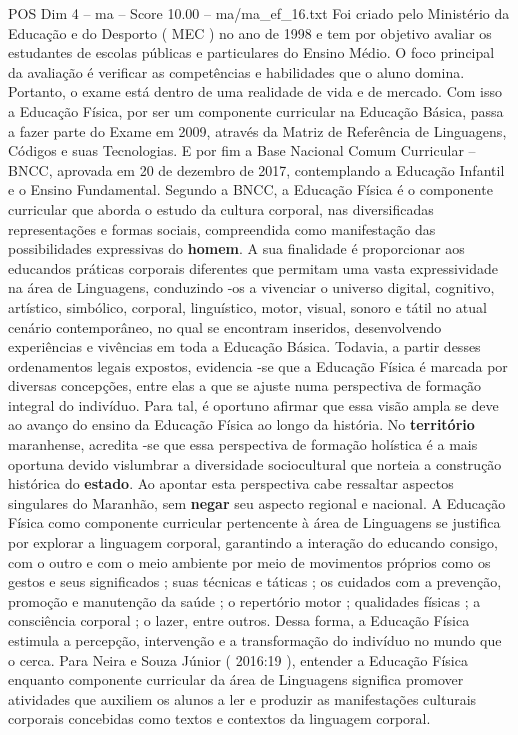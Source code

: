 \begin{textsample}{POS Dim 4 – ma – Score 10.00 – ma/ma\_ef\_16.txt}
Foi criado pelo Ministério da Educação e do Desporto ( MEC ) no ano de 1998 e tem por objetivo avaliar os estudantes de escolas públicas e particulares do Ensino Médio.
O foco principal da avaliação é verificar as competências e habilidades que o aluno domina.
Portanto, o exame está dentro de uma realidade de vida e de mercado.
Com isso a Educação Física, por ser um componente curricular na Educação Básica, passa a fazer parte do Exame em 2009, através da Matriz de Referência de Linguagens, Códigos e suas Tecnologias.
E por fim a Base Nacional Comum Curricular – BNCC, aprovada em 20 de dezembro de 2017, contemplando a Educação Infantil e o Ensino Fundamental.
Segundo a BNCC, a Educação Física é o componente curricular que aborda o estudo da cultura corporal, nas diversificadas representações e formas sociais, compreendida como manifestação das possibilidades expressivas do \textbf{homem}.
A sua finalidade é proporcionar aos educandos práticas corporais diferentes que permitam uma vasta expressividade na área de Linguagens, conduzindo -os a vivenciar o universo digital, cognitivo, artístico, simbólico, corporal, linguístico, motor, visual, sonoro e tátil no atual cenário contemporâneo, no qual se encontram inseridos, desenvolvendo experiências e vivências em toda a Educação Básica.
Todavia, a partir desses ordenamentos legais expostos, evidencia -se que a Educação Física é marcada por diversas concepções, entre elas a que se ajuste numa perspectiva de formação integral do indivíduo.
Para tal, é oportuno afirmar que essa visão ampla se deve ao avanço do ensino da Educação Física ao longo da história.
No \textbf{território} maranhense, acredita -se que essa perspectiva de formação holística é a mais oportuna devido vislumbrar a diversidade sociocultural que norteia a construção histórica do \textbf{estado}.
Ao apontar esta perspectiva cabe ressaltar aspectos singulares do Maranhão, sem \textbf{negar} seu aspecto regional e nacional.
A Educação Física como componente curricular pertencente à área de Linguagens se justifica por explorar a linguagem corporal, garantindo a interação do educando consigo, com o outro e com o meio ambiente por meio de movimentos próprios como os gestos e seus significados ; suas técnicas e táticas ; os cuidados com a prevenção, promoção e manutenção da saúde ; o repertório motor ; qualidades físicas ; a consciência corporal ; o lazer, entre outros.
Dessa forma, a Educação Física estimula a percepção, intervenção e a transformação do indivíduo no mundo que o cerca.
Para Neira e Souza Júnior ( 2016:19 ), entender a Educação Física enquanto componente curricular da área de Linguagens significa promover atividades que auxiliem os alunos a ler e produzir as manifestações culturais corporais concebidas como textos e contextos da linguagem corporal.

\end{textsample}

